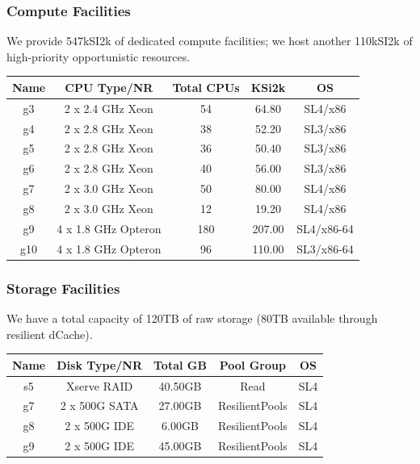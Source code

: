 \documentclass{beamer}
\begin{document}
\begin{frame}
\frametitle{Compute Facilities}
We provide 547kSI2k of dedicated compute facilities; we host another 110kSI2k 
of high-priority opportunistic resources.

\vspace{.4cm}

\begin{center}
\begin{tabular}[c]{|c|c|c|c|c|}
\hline
{\bf Name}   & {\bf CPU Type/NR} & {\bf Total CPUs}  & {\bf KSi2k}   & {\bf OS} \\
\hline
g3  & 2 x 2.4 GHz Xeon      & 54    & 64.80     & SL4/x86 \\
g4  & 2 x 2.8 GHz Xeon      & 38    & 52.20     & SL3/x86 \\
g5  & 2 x 2.8 GHz Xeon      & 36    & 50.40     & SL3/x86 \\
g6  & 2 x 2.8 GHz Xeon      & 40    & 56.00     & SL3/x86 \\
g7  & 2 x 3.0 GHz Xeon      & 50    & 80.00     & SL4/x86 \\
g8  & 2 x 3.0 GHz Xeon      & 12    & 19.20     & SL4/x86 \\
g9  & 4 x 1.8 GHz Opteron   & 180   & 207.00    & SL4/x86-64 \\
g10 & 4 x 1.8 GHz Opteron   & 96    & 110.00    & SL3/x86-64\footnotemark[1] \\
\hline
\end{tabular}
\end{center}
\end{frame}

\begin{frame}
\frametitle{Storage Facilities}
We have a total capacity of 120TB of raw storage (80TB available through 
resilient dCache).

\vspace{.4cm}

\begin{center}
\begin{tabular}[c]{|c|c|c|c|c|}
\hline
{\bf Name}   & {\bf Disk Type/NR} & {\bf Total GB}  & {\bf Pool Group}  & {\bf OS} \\
\hline
s5  & Xserve RAID   & 40.50GB   & Read              & SL4 \\
g7  & 2 x 500G SATA & 27.00GB   & ResilientPools    & SL4 \\
g8  & 2 x 500G IDE  & 6.00GB    & ResilientPools    & SL4 \\
g9  & 2 x 500G IDE  & 45.00GB   & ResilientPools    & SL4 \\
\hline
\end{tabular}
\end{center}
\end{frame}
\end{document}

